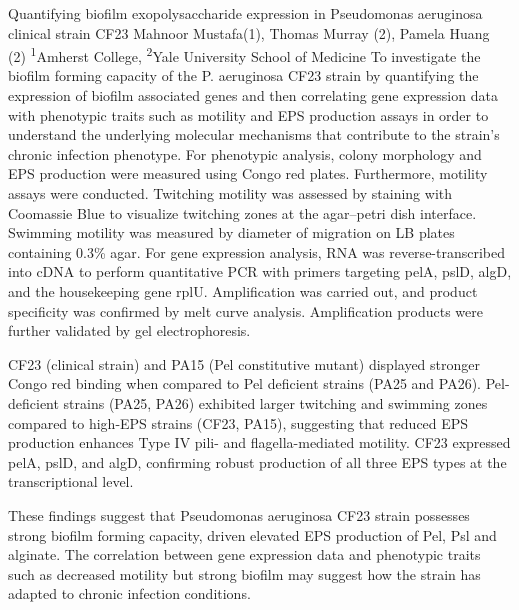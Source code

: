 \makeabstract
{
Quantifying biofilm exopolysaccharide expression in Pseudomonas aeruginosa clinical strain CF23
}
{
Mahnoor Mustafa(1), Thomas Murray (2), Pamela Huang (2)
}
{
\textsuperscript{1}Amherst College, \textsuperscript{2}Yale University School of Medicine
}
{
To investigate the biofilm forming capacity of the P. aeruginosa CF23 strain by quantifying the expression of biofilm associated genes and then correlating gene expression data with phenotypic traits such as motility and EPS production assays in order to understand the underlying molecular mechanisms that contribute to the strain’s chronic infection phenotype.
}
{
For phenotypic analysis, colony morphology and EPS production were measured using Congo red plates. Furthermore, motility assays were conducted. Twitching motility was assessed by staining with Coomassie Blue to visualize twitching zones at the agar–petri dish interface. Swimming motility was measured by diameter of migration on LB plates containing 0.3\% agar. 
For gene expression analysis, RNA was reverse-transcribed into cDNA to perform quantitative PCR with primers targeting pelA, pslD, algD, and the housekeeping gene rplU. Amplification was carried out, and product specificity was confirmed by melt curve analysis. Amplification products were further validated by gel electrophoresis.
}
{
CF23 (clinical strain) and PA15 (Pel constitutive mutant) displayed stronger Congo red binding when compared to Pel deficient strains (PA25 and PA26). Pel-deficient strains (PA25, PA26) exhibited larger twitching and swimming zones compared to high-EPS strains (CF23, PA15), suggesting that reduced EPS production enhances Type IV pili- and flagella-mediated motility. CF23 expressed pelA, pslD, and algD, confirming robust production of all three EPS types at the transcriptional level.

}
{
These findings suggest that Pseudomonas aeruginosa CF23 strain possesses strong biofilm forming capacity, driven elevated EPS production of Pel, Psl and alginate. The correlation between gene expression data and phenotypic traits such as decreased motility but strong biofilm may suggest how the strain has adapted to chronic infection conditions.
}

\newpage
